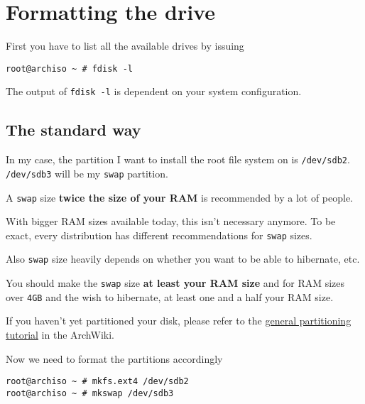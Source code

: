 \documentclass[9pt]{report}
\newenvironment{NOTE}
{\begin{tcolorbox}[colback=admonitionBG,coltitle=draculaFG,colframe=draculaBlue,colbacktitle=draculaBlue,title=NOTE]}
{\end{tcolorbox}}
\newenvironment{IMPORTANT}
{\begin{tcolorbox}[colback=admonitionBG,coltitle=draculaFG,colframe=draculaRed,colbacktitle=draculaRed,title=IMPORTANT]}
{\end{tcolorbox}}
\begin{document}
\newpage

\hypertarget{x-formatting-the-drive}{\section{Formatting the drive}}
First you have to list all the available drives by issuing


\begin{verbatim}
root@archiso ~ # fdisk -l
\end{verbatim}

\begin{NOTE}
    The output of \texttt{fdisk -l} is dependent on your system configuration.
\end{NOTE}

\newpage

\hypertarget{x-the-standard-way}{\subsection{The standard way}}
In my case, the partition I want to install the root file system on is \texttt{/dev/sdb2}.
\texttt{/dev/sdb3} will be my \texttt{swap} partition.


\begin{NOTE}
    A \texttt{swap} size \textbf{twice the size of your RAM} is recommended by a lot of people.


    With bigger RAM sizes available today, this isn’t necessary anymore.
    To be exact, every distribution has different recommendations for \texttt{swap} sizes.


    Also \texttt{swap} size heavily depends on whether you want to be able to hibernate, etc.


    You should make the \texttt{swap} size \textbf{at least your RAM size} and for RAM sizes over \texttt{4GB} and the wish to hibernate, at least one and a half your RAM size.

\end{NOTE}
\begin{IMPORTANT}
    If you haven’t yet partitioned your disk, please refer to the \href{https://wiki.archlinux.org/index.php/Partitioning}{general partitioning tutorial} in the ArchWiki.

\end{IMPORTANT}
Now we need to format the partitions accordingly


\begin{verbatim}
root@archiso ~ # mkfs.ext4 /dev/sdb2
root@archiso ~ # mkswap /dev/sdb3
\end{verbatim}
\end{document}
